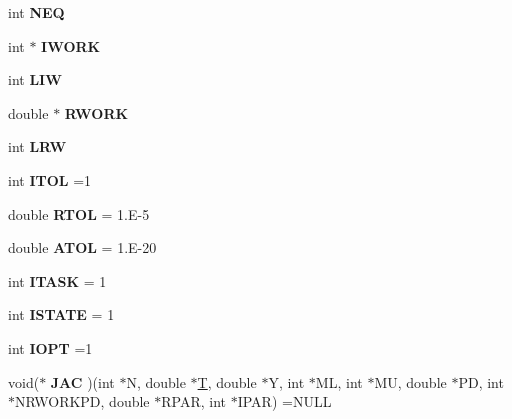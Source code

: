 \begin{DoxyCompactItemize}
int {\bfseries N\+EQ}
\item 
\mbox{\label{structUModel_1_1__ODEPAR_a4d3aca7b7e2f6a5fc5c7c5d46ad5cc94}} 
int $\ast$ {\bfseries I\+W\+O\+RK}
\item 
\mbox{\label{structUModel_1_1__ODEPAR_ae61dee0c304fe6e1ff23d384e2f6f22e}} 
int {\bfseries L\+IW}
\item 
\mbox{\label{structUModel_1_1__ODEPAR_afc3d67c6cd232cd64f5af637b8dac59a}} 
double $\ast$ {\bfseries R\+W\+O\+RK}
\item 
\mbox{\label{structUModel_1_1__ODEPAR_a5fc87aa51fed5065bb2ecb25d9df13d1}} 
int {\bfseries L\+RW}
\item 
\mbox{\label{structUModel_1_1__ODEPAR_a726749046d89df737da64ab06b3498b5}} 
int {\bfseries I\+T\+OL} =1
\item 
\mbox{\label{structUModel_1_1__ODEPAR_ab86524dfb4b14f806411bf3a7028f658}} 
double {\bfseries R\+T\+OL} = 1.\+E-\/5
\item 
\mbox{\label{structUModel_1_1__ODEPAR_a9267fbaa8a77c5604000a9ae11a30d04}} 
double {\bfseries A\+T\+OL} = 1.\+E-\/20
\item 
\mbox{\label{structUModel_1_1__ODEPAR_a1a6d5be08279269961e73732a39c5989}} 
int {\bfseries I\+T\+A\+SK} = 1
\item 
\mbox{\label{structUModel_1_1__ODEPAR_abc1065ef47e6f953d5ea1cccb29e0126}} 
int {\bfseries I\+S\+T\+A\+TE} = 1
\item 
\mbox{\label{structUModel_1_1__ODEPAR_aab15af2cf0efcc50857822da6f84ca66}} 
int {\bfseries I\+O\+PT} =1
\item 
\mbox{\label{structUModel_1_1__ODEPAR_accabc313291f45ab645ac25651e262b4}} 
void($\ast$ {\bfseries J\+AC} )(int $\ast$N, double $\ast$\hyperlink{structUModel_1_1__ODEPAR_a407dfd8303377097296a7288d964555e}{T}, double $\ast$Y, int $\ast$ML, int $\ast$MU, double $\ast$PD, int $\ast$N\+R\+W\+O\+R\+K\+PD, double $\ast$R\+P\+AR, int $\ast$I\+P\+AR) =N\+U\+LL

\end{DoxyCompactItemize}
